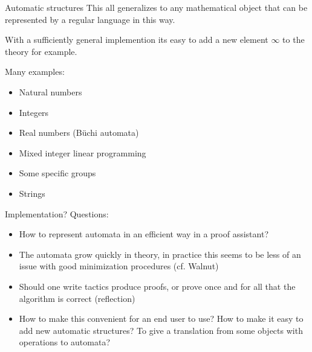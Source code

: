 \begin{frame}{Automatic structures}
This all generalizes to any mathematical object that can be represented by a regular language in this way.

With a sufficiently general implemention its easy to add a new element $\infty$ to the theory for example.

Many examples:
\begin{itemize}
\item Natural numbers
\item Integers
\item Real numbers (B\"uchi automata)
\item Mixed integer linear programming
\item Some specific groups
\item Strings
\end{itemize}
\end{frame}


\begin{frame}{Implementation?}
Questions:
\begin{itemize}
\item How to represent automata in an efficient way in a proof assistant?
\item The automata grow quickly in theory, in practice this seems to be less of an issue with good minimization procedures (cf. Walnut)
\item Should one write tactics produce proofs, or prove once and for all that the algorithm is correct (reflection)
\item How to make this convenient for an end user to use? How to make it easy to add new automatic structures?
    To give a translation from some objects with operations to automata?
\end{itemize}
\end{frame}


